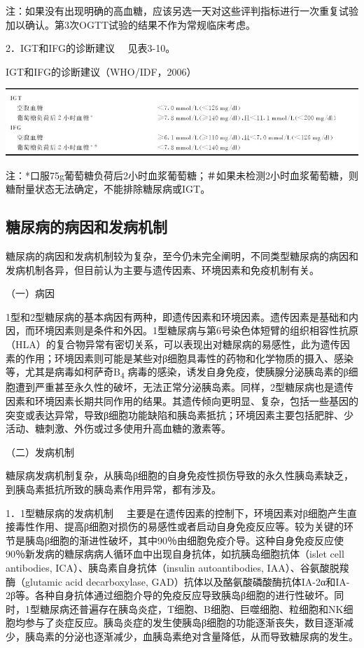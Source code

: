 注：如果没有出现明确的高血糖，应该另选一天对这些评判指标进行一次重复试验加以确认。第3次OGTT试验的结果不作为常规临床考虑。

{2．IGT和IFG的诊断建议} 　见表3-10。

\begin{table}[htbp]
\centering
\caption{IGT和IFG的诊断建议（WHO/IDF，2006）}
\label{tab3-10}
\includegraphics{./images/Image00026.jpg}
\end{table}

注：*口服75g葡萄糖负荷后2小时血浆葡萄糖；＃如果未检测2小时血浆葡萄糖，则糖耐量状态无法确定，不能排除糖尿病或IGT。

\hypertarget{text00004.htmlux5cux23mllj20}{%
\subsection{糖尿病的病因和发病机制}\label{text00004.htmlux5cux23mllj20}}

糖尿病的病因和发病机制较为复杂，至今仍未完全阐明，不同类型糖尿病的病因和发病机制各异，但目前认为主要与遗传因素、环境因素和免疫机制有关。

（一）病因

1型和2型糖尿病的基本病因有两种，即遗传因素和环境因素。遗传因素是基础和内因，而环境因素则是条件和外因。1型糖尿病与第6号染色体短臂的组织相容性抗原（HLA）的复合物异常有密切关系，可以表现出对糖尿病的易感性，此为遗传因素的作用；环境因素则可能是某些对β细胞具毒性的药物和化学物质的摄入、感染等，尤其是病毒如柯萨奇B\textsubscript{4}
病毒的感染，诱发自身免疫，使胰腺分泌胰岛素的β细胞遭到严重甚至永久性的破坏，无法正常分泌胰岛素。同样，2型糖尿病也是遗传因素和环境因素长期共同作用的结果。其遗传倾向更明显、复杂，包括一些基因的突变或表达异常，导致β细胞功能缺陷和胰岛素抵抗；环境因素主要包括肥胖、少活动、糖刺激、外伤或过多使用升高血糖的激素等。

（二）发病机制

糖尿病发病机制复杂，从胰岛β细胞的自身免疫性损伤导致的永久性胰岛素缺乏，到胰岛素抵抗所致的胰岛素作用异常，都有涉及。

{1．1型糖尿病的发病机制}
　主要是在遗传因素的控制下，环境因素对β细胞产生直接毒性作用、提高β细胞对损伤的易感性或者启动自身免疫反应等。较为关键的环节是胰岛β细胞的渐进性破坏，其中90％由细胞免疫介导。这种自身免疫反应使90％新发病的糖尿病病人循环血中出现自身抗体，如抗胰岛细胞抗体（islet
cell antibodies, ICA）、胰岛素自身抗体（insulin autoantibodies,
IAA）、谷氨酸脱羧酶（glutamic acid decarboxylase,
GAD）抗体以及酪氨酸磷酸酶抗体IA-2α和IA-2β等。各种自身抗体通过细胞介导的免疫反应导致胰岛β细胞的进行性破坏。同时，1型糖尿病还普遍存在胰岛炎症，T细胞、B细胞、巨噬细胞、粒细胞和NK细胞均参与了炎症反应。胰岛炎症的发生使胰岛β细胞的功能逐渐丧失，数目逐渐减少，胰岛素的分泌也逐渐减少，血胰岛素绝对含量降低，从而导致糖尿病的发生。


